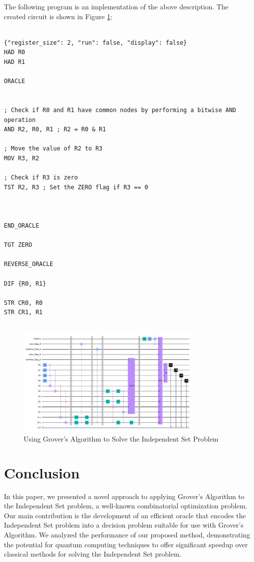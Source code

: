 The following program is an implementation of the above description. The created circuit is shown in Figure \ref{fig:Independent_Set}:

\begin{lstlisting}

{"register_size": 2, "run": false, "display": false}
HAD R0
HAD R1

ORACLE


; Check if R0 and R1 have common nodes by performing a bitwise AND operation
AND R2, R0, R1 ; R2 = R0 & R1

; Move the value of R2 to R3
MOV R3, R2

; Check if R3 is zero
TST R2, R3 ; Set the ZERO flag if R3 == 0



END_ORACLE

TGT ZERO

REVERSE_ORACLE

DIF {R0, R1}

STR CR0, R0
STR CR1, R1


\end{lstlisting}

\begin{figure}[htp]
    \centering
    \includegraphics[width=9cm]{Figures/Independent_Set_circuit.png}
    \caption{Using Grover's Algorithm to Solve the Independent Set Problem}
    \label{fig:Independent_Set}
\end{figure}

\section{Conclusion} \label{sec:conclusion}

In this paper, we presented a novel approach to applying Grover's Algorithm to the Independent Set problem, a well-known combinatorial optimization problem. Our main contribution is the development of an efficient oracle that encodes the Independent Set problem into a decision problem suitable for use with Grover's Algorithm. We analyzed the performance of our proposed method, demonstrating the potential for quantum computing techniques to offer significant speedup over classical methods for solving the Independent Set problem.

